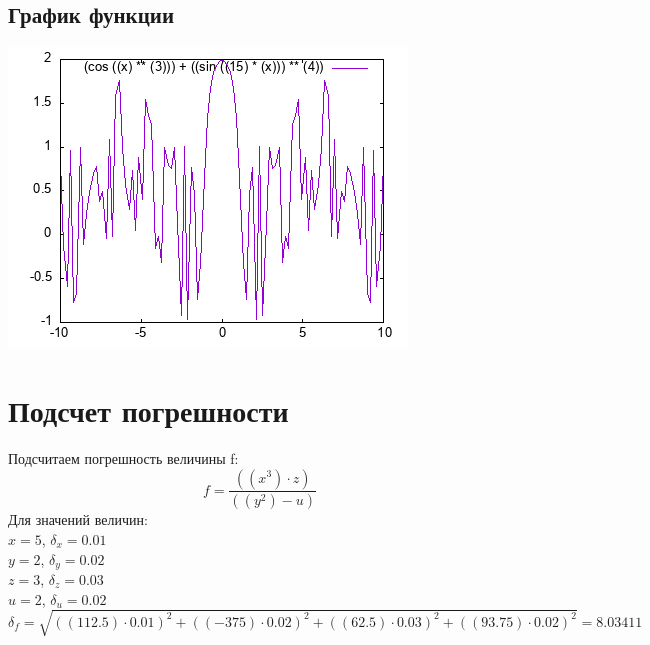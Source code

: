 \documentclass[a4paper,12pt]{article} %
\begin{document}
\subsection{График функции} 
 \includegraphics{graphic.png}\\

\newpage 
 \section{Подсчет погрешности} 
 Подсчитаем погрешность величины f: \\
\[ f =  \frac {({({x} ^ {{3}})} \cdot {z})}{({({y} ^ {{2}})} - {u})}\]
Для значений величин: \\$x = 5$, $\delta_{x} = 0.01$\\$y = 2$, $\delta_{y} = 0.02$\\$z = 3$, $\delta_{z} = 0.03$\\$u = 2$, $\delta_{u} = 0.02$\\\[\delta_{f} = \sqrt{((112.5) \cdot 0.01)^2 + ((-375) \cdot 0.02)^2 + ((62.5) \cdot 0.03)^2 + ((93.75) \cdot 0.02)^2} = 8.03411 \]
\end{document}
